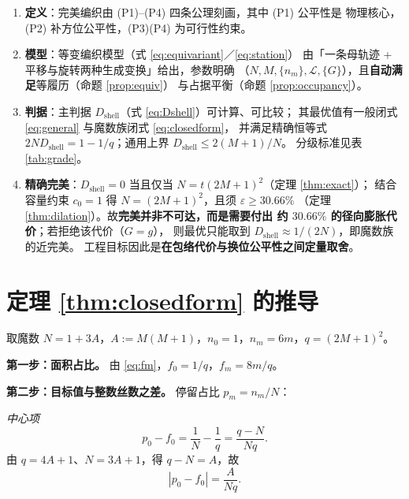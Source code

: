 \documentclass[12pt, a4paper]{ctexart}
\begin{document}
\begin{enumerate}[label=(\arabic*), leftmargin=2.4em, itemsep=3pt]
\item \textbf{定义}：完美编织由 (P1)--(P4) 四条公理刻画，其中 (P1) 公平性是
物理核心，(P2) 补方位公平性，(P3)(P4) 为可行性约束。

\item \textbf{模型}：等变编织模型（式 \eqref{eq:equivariant}／\eqref{eq:station}）
由「一条母轨迹 + 平移与旋转两种生成变换」给出，参数明确
（$N,M,\{n_m\},\mathcal{L},\{G\}$），且\textbf{自动满足}等履历（命题 \ref{prop:equiv}）
与占据平衡（命题 \ref{prop:occupancy}）。

\item \textbf{判据}：主判据 $D_{\mathrm{shell}}$（式 \eqref{eq:Dshell}）可计算、可比较；
其最优值有一般闭式 \eqref{eq:general} 与魔数族闭式 \eqref{eq:closedform}，
并满足精确恒等式 $2ND_{\mathrm{shell}}=1-1/q$；通用上界 $D_{\mathrm{shell}}\le 2(M+1)/N$。
分级标准见表 \ref{tab:grade}。

\item \textbf{精确完美}：$D_{\mathrm{shell}}=0$ 当且仅当 $N=t(2M+1)^2$（定理 \ref{thm:exact}）；
结合容量约束 $c_0=1$ 得 $N=(2M+1)^2$，且须 $\varepsilon\ge 30.66\%$
（定理 \ref{thm:dilation}）。故\textbf{完美并非不可达，而是需要付出
约 $30.66\%$ 的径向膨胀代价}；若拒绝该代价（$G=g$），
则最优只能取到 $D_{\mathrm{shell}}\approx 1/(2N)$，即魔数族的近完美。
工程目标因此是\textbf{在包络代价与换位公平性之间定量取舍}。
\end{enumerate}

\appendix

\section{定理 \ref{thm:closedform} 的推导}
\label{app:proof}

取魔数 $N = 1+3A$，$A := M(M+1)$，$n_0=1$，$n_m=6m$，$q=(2M+1)^2$。

\vspace{4pt}
\textbf{第一步：面积占比。} 由 \eqref{eq:fm}，$f_0 = 1/q$，$f_m = 8m/q$。

\vspace{4pt}
\textbf{第二步：目标值与整数丝数之差。} 停留占比 $p_m = n_m/N$：

\emph{中心项}
\begin{equation}
p_0 - f_0 = \frac{1}{N}-\frac{1}{q}
= \frac{q-N}{Nq}.
\end{equation}
由 $q = 4A+1$、$N = 3A+1$，得 $q-N = A$，故
\begin{equation}
\left|p_0-f_0\right| = \frac{A}{Nq}.
\end{equation}
\end{document}

